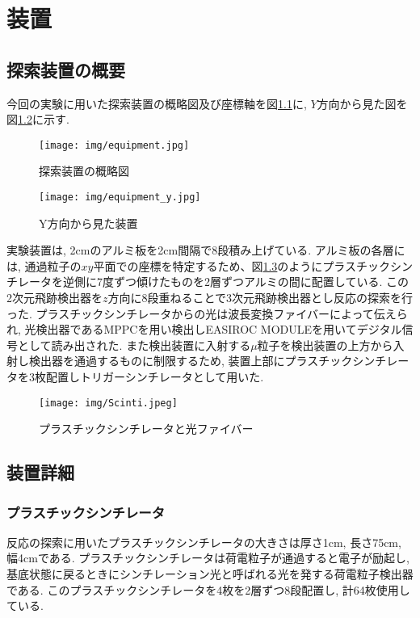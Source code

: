 \chapter{装置} \label{equipment}
\section{探索装置の概要}
今回の実験に用いた探索装置の概略図及び座標軸を図\ref{fig:arrangement}に, $Y$方向から見た図を図\ref{fig:y_arrangement}に示す.


\begin{figure}[H]
    \centering
    \texttt{[image: img/equipment.jpg]}
    \caption{探索装置の概略図}
    \label{fig:arrangement}
\end{figure}

\begin{figure}[H]
    \centering
    \texttt{[image: img/equipment\_y.jpg]}
    \caption{Y方向から見た装置}
    \label{fig:y_arrangement}
\end{figure}

実験装置は, 2cmのアルミ板を2cm間隔で8段積み上げている.
アルミ板の各層には, 通過粒子の$xy$平面での座標を特定するため、図\ref{fig:fiber}のようにプラスチックシンチレータを逆側に7度ずつ傾けたものを2層ずつアルミの間に配置している.
この2次元飛跡検出器を$z$方向に8段重ねることで3次元飛跡検出器とし反応の探索を行った.
プラスチックシンチレータからの光は波長変換ファイバーによって伝えられ, 光検出器であるMPPCを用い検出しEASIROC MODULEを用いてデジタル信号として読み出された.
また検出装置に入射する$\mu$粒子を検出装置の上方から入射し検出器を通過するものに制限するため, 装置上部にプラスチックシンチレータを3枚配置しトリガーシンチレータとして用いた.

\begin{figure}[H]
    \centering
    \texttt{[image: img/Scinti.jpeg]}
    \caption{プラスチックシンチレータと光ファイバー}
    \label{fig:fiber}
\end{figure}

\section{装置詳細}
\subsection{プラスチックシンチレータ}
反応の探索に用いたプラスチックシンチレータの大きさは厚さ1cm, 長さ75cm, 幅4cmである.
プラスチックシンチレータは荷電粒子が通過すると電子が励起し, 基底状態に戻るときにシンチレーション光と呼ばれる光を発する荷電粒子検出器である.
このプラスチックシンチレータを4枚を2層ずつ8段配置し, 計64枚使用している.

